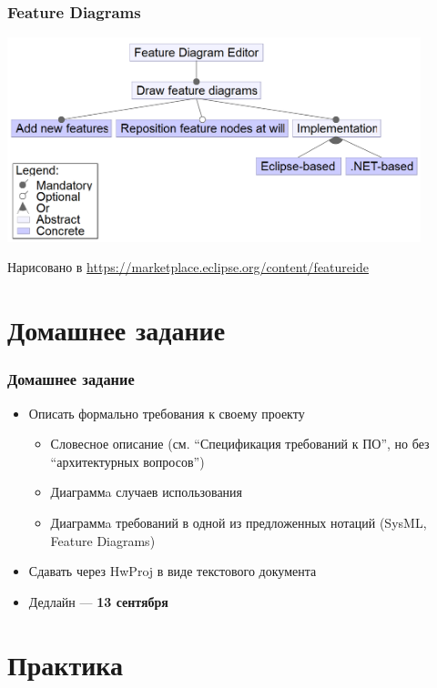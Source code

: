 \documentclass[xetex,mathserif,serif]{beamer}
\begin{document}
	\begin{frame}
		\frametitle{Feature Diagrams}
		\begin{center}
			\includegraphics[width=0.9\textwidth]{featureDiagram.png}
		\end{center}
		\begin{footnotesize}
			Нарисовано в \url{https://marketplace.eclipse.org/content/featureide}
		\end{footnotesize}
	\end{frame}

	\section{Домашнее задание}

	\begin{frame}
		\frametitle{Домашнее задание}
		\begin{itemize}
			\item Описать формально требования к своему проекту
			\begin{itemize}
				\item Словесное описание (см. ``Спецификация требований к ПО'', но без ``архитектурных вопросов'')
				\item Диаграммa случаев использования
				\item Диаграммa требований в одной из предложенных нотаций (SysML, Feature Diagrams)
			\end{itemize}
			\item Сдавать через HwProj в виде текстового документа
			\item Дедлайн --- \textbf{13 сентября}
		\end{itemize}
	\end{frame}

	\section{Практика}
\end{document}
